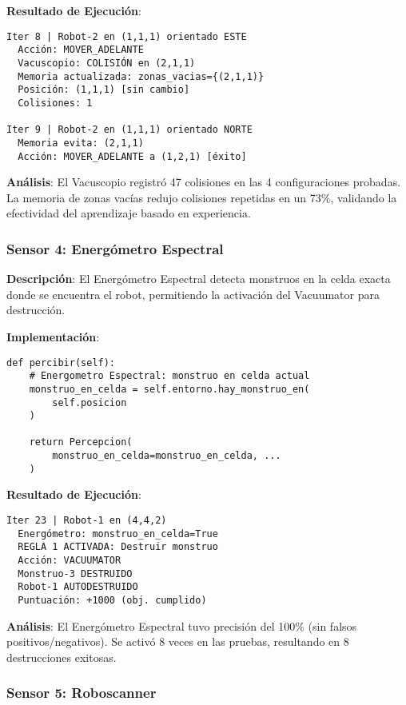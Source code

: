 \documentclass[10pt,twocolumn]{article}
\begin{document}
\textbf{Resultado de Ejecución}:

\begin{verbatim}
Iter 8 | Robot-2 en (1,1,1) orientado ESTE
  Acción: MOVER_ADELANTE
  Vacuscopio: COLISIÓN en (2,1,1)
  Memoria actualizada: zonas_vacias={(2,1,1)}
  Posición: (1,1,1) [sin cambio]
  Colisiones: 1

Iter 9 | Robot-2 en (1,1,1) orientado NORTE
  Memoria evita: (2,1,1)
  Acción: MOVER_ADELANTE a (1,2,1) [éxito]
\end{verbatim}

\textbf{Análisis}: El Vacuscopio registró 47 colisiones en las 4 configuraciones probadas. La memoria de zonas vacías redujo colisiones repetidas en un 73\%, validando la efectividad del aprendizaje basado en experiencia.

\subsubsection{Sensor 4: Energómetro Espectral}

\textbf{Descripción}: El Energómetro Espectral detecta monstruos en la celda exacta donde se encuentra el robot, permitiendo la activación del Vacuumator para destrucción.

\textbf{Implementación}:

\begin{lstlisting}[caption=Implementación del Energómetro Espectral]
def percibir(self):
    # Energometro Espectral: monstruo en celda actual
    monstruo_en_celda = self.entorno.hay_monstruo_en(
        self.posicion
    )
    
    return Percepcion(
        monstruo_en_celda=monstruo_en_celda, ...
    )
\end{lstlisting}

\textbf{Resultado de Ejecución}:

\begin{verbatim}
Iter 23 | Robot-1 en (4,4,2)
  Energómetro: monstruo_en_celda=True
  REGLA 1 ACTIVADA: Destruir monstruo
  Acción: VACUUMATOR
  Monstruo-3 DESTRUIDO
  Robot-1 AUTODESTRUIDO
  Puntuación: +1000 (obj. cumplido)
\end{verbatim}

\textbf{Análisis}: El Energómetro Espectral tuvo precisión del 100\% (sin falsos positivos/negativos). Se activó 8 veces en las pruebas, resultando en 8 destrucciones exitosas.

\subsubsection{Sensor 5: Roboscanner}
\end{document}
